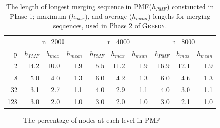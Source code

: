 \documentclass[12pt]{article}
\newcommand{\comment}[2]{{\color{red}{\bf (#1: #2)}}}
\newcommand{\greedyAlgo}{\textsc{Greedy}}
\begin{document}
\begin{table}[ht]
\center
\begin{tabular}{r|rrr|rrr|rrr}
 & \multicolumn{3}{c|}{n=2000} & \multicolumn{3}{c|}{n=4000} & \multicolumn{3}{c}{n=8000} \\
p &  $h_{PMF}$ &  $h_{max}$ &  $h_{mean}$ &  $h_{PMF}$ &  $h_{max}$ &  $h_{mean}$ &  $h_{PMF}$ &  $h_{max}$ &  $h_{mean}$ \\ \hline
 2 &  14.2 &  10.0 &  1.9 &  15.5 &  11.2 &  1.9 &  16.9 &  12.1 &  1.9 \\
 8 &  5.0 &  4.0 &  1.3 &  6.0 &  4.2 &  1.3 &  6.0 &  4.6 &  1.3 \\
 32 &  3.1 &  2.7 &  1.1 &  4.0 &  2.9 &  1.1 &  4.0 &  3.0 &  1.1 \\
 128 &  3.0 &  2.0 &  1.0 &  3.0 &  2.0 &  1.0 &  3.0 &  2.1 &  1.0
\end{tabular}
\caption{The length of longest merging sequence in PMF($h_{PMF}$) constructed in Phase 1; maximum ($h_{max}$), and average ($h_{mean}$) lengths for merging sequences, used in Phase 2 of \greedyAlgo. \comment{sertac}{cerny deneyleri}}
\label{table:levels}
\end{table}

\begin{figure}[ht]
	\centering
	\caption{The percentage of nodes at each level in PMF \comment{sertac}{distance yerine length yazmak lazim. Daha okunabilir ve diger graphlerle uyumlu bir halini yapmak icin graphlerin exceldeki hallerini bulmam lazim}}
	\label{fig:nodes-at-levels}
	\vspace*{-2.5ex}
\end{figure}
\end{document}
